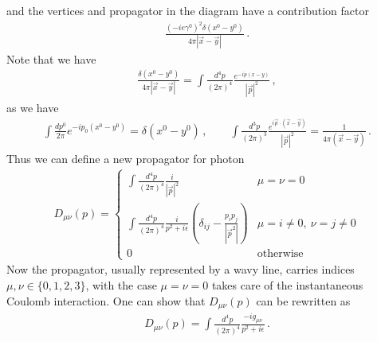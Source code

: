 \documentclass[11pt, onesided]{book}
\theoremstyle{break}
\theoremstyle{break}
\begin{document}
and the vertices and propagator in the diagram have a contribution factor 
\begin{align*}
\frac{(-ie\gamma^0)^2 \delta(x^0 - y^0)}{4\pi |\vec{x} -\vec{y}|}\,.
\end{align*}
Note that we have
\begin{align*}
\frac{\delta(x^0 - y^0)}{4\pi |\vec{x} - \vec{y}|} = \int \frac{d^4p}{(2\pi)^4}\frac{e^{-ip(x-y)}}{|\vec{p}|^2}\,,
\end{align*}
as we have
\begin{align*}
\int \frac{dp^0}{2\pi}e^{-ip_0(x^0 - y^0)} = \delta(x^0 - y^0)\,,\qquad
\int \frac{d^3p}{(2\pi)^3}\frac{e^{i\vec{p}\cdot (\vec{x} - \vec{y})}}{|\vec{p}|^2} = \frac{1}{4\pi (\vec{x} - \vec{y})}\,.
\end{align*}
Thus we can define a new propagator for photon
\begin{align*}
D_{\mu\nu}(p) = \begin{cases}
\int \frac{d^4 p}{(2\pi)^4} \frac{i}{|\vec{p}|^2} & \mu = \nu = 0\\
\int \frac{d^4 p}{(2\pi)^4} \frac{i}{p^2 + i\epsilon}\left( \delta_{ij} - \frac{p_ip_j}{|\vec{p}^2|}\right) &{\mu = i\neq 0}, \ \nu = j \neq 0\\
0 &\text{otherwise}
\end{cases}
\end{align*}
Now the propagator, usually represented by a wavy line, carries indices $\mu,\nu \in \{0,1,2,3\}$, with the case $\mu =\nu = 0$ takes care of the instantaneous Coulomb interaction. One can show that $D_{\mu\nu}(p)$ can be rewritten as
\begin{align*}
D_{\mu\nu}(p) =\int \frac{d^4p}{(2\pi)^4}  \frac{-ig_{\mu\nu}}{p^2 + i\epsilon}\,.
\end{align*}
\end{document}
